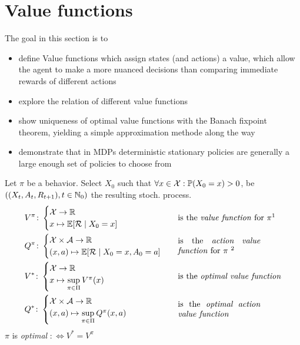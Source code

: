 \section{Value functions}
The goal in this section is to
\begin{itemize}
\item define Value functions which assign states (and actions) a value, which allow the agent to make a more nuanced decisions than comparing immediate rewards of different actions
\item explore the relation of different value functions
\item show uniqueness of optimal value functions with the Banach fixpoint theorem, yielding a simple approximation methode along the way
\item demonstrate that in MDPs deterministic stationary policies are generally a large enough set of policies to choose from
 \end{itemize}
\begin{definition} Let \(\pi\) be a behavior. Select \(X_0\) such that \(\forall x\in\mathcal{X}:\mathbb{P}({X_0=x})>0\), be \(((X_t,A_t,R_{t+1}), t\in \mathbb{N}_0)\) the resulting stoch. process.
\begin{align*}
	&V^\pi\colon
	\begin{cases}
		\cX\to\R\\
		x\mapsto \E[\cR\mid X_0=x]
	\end{cases} 
	&& \text{is the \emph{value function} for } \pi \footnotemark[1]
	\\
	&Q^\pi\colon
	\begin{cases}
		\cX\times\cA\to\R\\
		(x,a)\mapsto \E[\cR\mid X_0=x, A_0=a]
	\end{cases}
	&& \parbox{10em}{is the \emph{action value function} for \(\pi\) \footnotemark[2]}
	\\
	&V^*\colon
	\begin{cases}
		\cX\to\R\\
		x\mapsto \sup\limits_{\pi\in\Pi} V^\pi(x)
	\end{cases} 
	&& \text{is the \emph{optimal value function}}
	\\
	&Q^*\colon
	\begin{cases}
		\cX\times\cA\to\R\\
		(x,a)\mapsto \sup\limits_{\pi\in\Pi} Q^\pi(x,a)
	\end{cases}
	&& \parbox{10em}{is the \emph{optimal action value function}}
\end{align*}
\(\pi\) is \emph{optimal} \(:\iff V^*=V^\pi\)
\end{definition}


